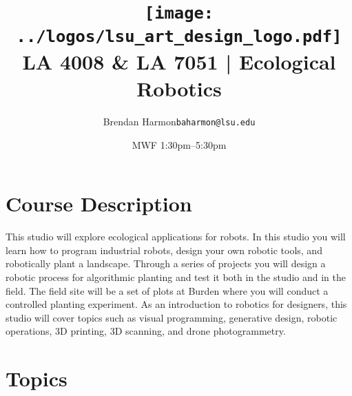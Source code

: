 \documentclass[11pt,article,oneside]{memoir}
\makeatletter
\def\myauthor{Author}
\def\mytitle{Title}
\def\myemail{baharmon@lsu.edu}
\def\myauthor{\normalsize Brendan Harmon}
\def\mytitle{
\texttt{[image: ../logos/lsu\_art\_design\_logo.pdf]}
\vspace*{0.5cm}
\\[0.1cm] {\normalfont \normalsize LA 4008 \& LA 7051 |} \Large Ecological Robotics
}
\newcommand{\globalcolor}[1]{%
  \color{#1}\global\let\default@color\current@color
}
\makeatother
\begin{document}
\setlength\bibitemsep{0.5em}

\setmainfont[Scale=1, Path = ../fonts/lato/,BoldItalicFont=Lato-RegIta,BoldFont=Lato-Reg,ItalicFont=Lato-LigIta]{Lato-Lig}
\setsansfont[Scale=1, Path = ../fonts/lato/,BoldItalicFont=Lato-RegIta,BoldFont=Lato-Reg,ItalicFont=Lato-LigIta]{Lato-Lig}
\setmonofont[Mapping=tex-text,Scale=0.8,Path = ../fonts/inconsolata/]{i}

\def\ind{\hangindent=1 true cm\hangafter=1 \noindent}
\def\labelitemi{$\cdot$}

\title{\LARGE \mytitle}
\author{\Large\myauthor \newline \footnotesize\texttt{\noindent\myemail}}
\date{
\footnotesize
MWF 1:30pm--5:30pm
}
\published{\,}


\globalcolor{black}

\vspace*{-12em}

\maketitle

\vspace*{-2em}
\section{Course Description}
\footnotesize
This studio will explore ecological applications for robots. In this studio you will learn how to program industrial robots, design your own robotic tools, and robotically plant a landscape. Through a series of projects you will design a robotic process for algorithmic planting and test it both in the studio and in the field. The field site will be a set of plots at Burden where you will conduct a controlled planting experiment. As an introduction to robotics for designers, this studio will cover topics such as visual programming, generative design, robotic operations, 3D printing, 3D scanning, and drone photogrammetry. 


\section{Topics}
\end{document}
